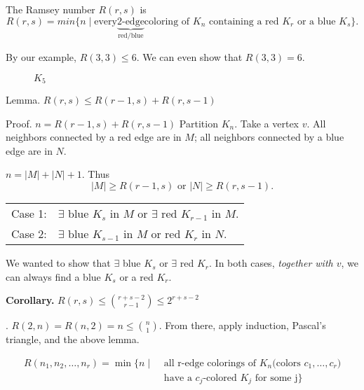 
\begin{definition}
The Ramsey number $R(r,s)$ is
\[
  R(r,s) =
    min \{n\mid \text{every} \underbrace{\text{2-edge}}_{\text{red/blue}} 
    \text{coloring of $K_n$ containing a red $K_r$ or a blue $K_s$}\}.
\]
\end{definition}

By our example, $R(3,3) ≤ 6$. We can even show that $R(3,3) = 6$.

\begin{figure}[htb]
  \centering
  \caption{$K_5$}
\end{figure}

Lemma. $R(r,s) ≤ R(r-1, s) + R(r, s-1)$

Proof. $n = R(r-1, s) + R(r, s-1)$
Partition $K_n$. Take a vertex $v$. All neighbors connected by a red edge are in $M$; all neighbors connected by a blue edge are in $N$.

$n = |M|+|N|+1$. Thus
\[
  |M| ≥ R(r-1, s) \text{ or } |N| ≥ R(r, s-1).
\]

\begin{tabular}{ll}
  Case 1: & $\exists$ blue $K_s$ in $M$ or $\exists$ red $K_{r-1}$ in $M$. \\
  Case 2: & $\exists$ blue $K_{s-1}$ in $M$ or red $K_r$ in $N$.
\end{tabular}

We wanted to show that $\exists$ blue $K_s$ or $\exists$ red $K_r$.
In both cases, \emph{together with $v$}, we can always find a blue $K_s$ or a red $K_r$.

\textbf{Corollary.} $R(r,s) ≤ {r+s-2 \choose r-1} ≤ 2^{r+s-2}$

\Proof. $R(2,n) = R(n,2) = n ≤ {n \choose 1}$. From there, apply induction, Pascal's triangle, and the above lemma.

\begin{definition}
\begin{align*}
  R(n_1,n_2,\ldots,n_r) = \min \{ n \mid
    &\text{ all r-edge colorings of $K_n$
      (colors $c_1,\ldots,c_r$)} \\
    & \text{ have a $c_j$-colored $K_j$ for some j}\}
\end{align*}
\end{definition}











